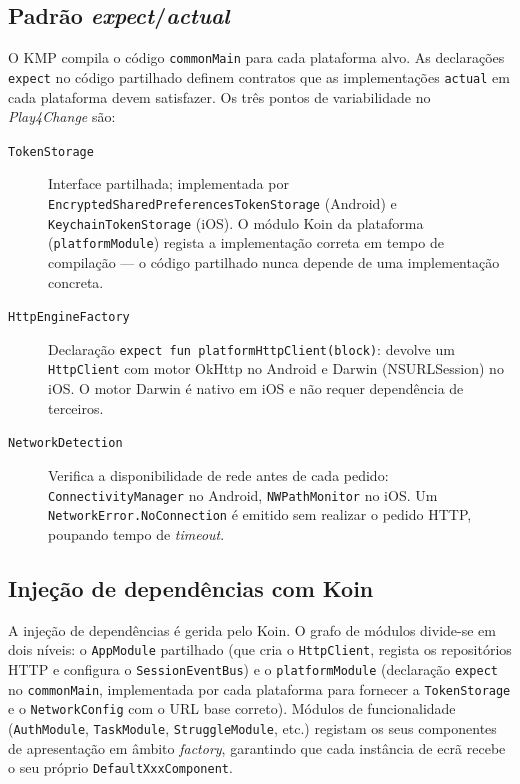 \subsection*{Padrão \textit{expect}/\textit{actual}}

O KMP compila o código \texttt{commonMain} para cada plataforma alvo.
As declarações \texttt{expect} no código partilhado definem contratos que
as implementações \texttt{actual} em cada plataforma devem satisfazer.
Os três pontos de variabilidade no \textit{Play4Change} são:

\begin{description}
  \item[\texttt{TokenStorage}] Interface partilhada; implementada por
    \texttt{EncryptedSharedPreferencesTokenStorage} (Android) e
    \texttt{KeychainTokenStorage} (iOS).
    O módulo Koin da plataforma (\texttt{platformModule}) regista a
    implementação correta em tempo de compilação — o código partilhado
    nunca depende de uma implementação concreta.

  \item[\texttt{HttpEngineFactory}] Declaração \texttt{expect fun
    platformHttpClient(block)}: devolve um \texttt{HttpClient} com motor
    OkHttp no Android e Darwin (NSURLSession) no iOS.
    O motor Darwin é nativo em iOS e não requer dependência de terceiros.

  \item[\texttt{NetworkDetection}] Verifica a disponibilidade de rede
    antes de cada pedido: \texttt{ConnectivityManager} no Android,
    \texttt{NWPathMonitor} no iOS.
    Um \texttt{NetworkError.NoConnection} é emitido sem realizar o pedido
    HTTP, poupando tempo de \textit{timeout}.
\end{description}

\subsection*{Injeção de dependências com Koin}

A injeção de dependências é gerida pelo Koin.
O grafo de módulos divide-se em dois níveis: o \texttt{AppModule}
partilhado (que cria o \texttt{HttpClient}, regista os repositórios HTTP
e configura o \texttt{SessionEventBus}) e o \texttt{platformModule}
(declaração \texttt{expect} no \texttt{commonMain}, implementada por cada
plataforma para fornecer a \texttt{TokenStorage} e o \texttt{NetworkConfig}
com o URL base correto).
Módulos de funcionalidade (\texttt{AuthModule}, \texttt{TaskModule},
\texttt{StruggleModule}, etc.) registam os seus componentes de apresentação
em âmbito \textit{factory}, garantindo que cada instância de ecrã recebe
o seu próprio \texttt{DefaultXxxComponent}.

